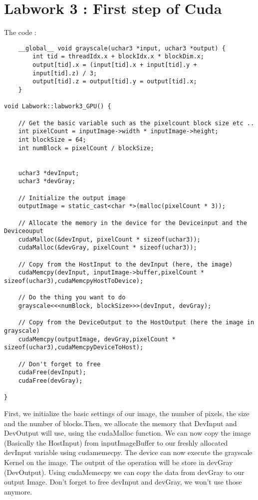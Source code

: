 \documentclass[paper=a4, fontsize=11pt]{scrartcl}
\begin{document}
\section{Labwork 3 : First step of Cuda}

    
    The code :
    \begin{verbatim}
    __global__ void grayscale(uchar3 *input, uchar3 *output) {
        int tid = threadIdx.x + blockIdx.x * blockDim.x;
        output[tid].x = (input[tid].x + input[tid].y +
        input[tid].z) / 3;
        output[tid].z = output[tid].y = output[tid].x;
    }
	
void Labwork::labwork3_GPU() {

	// Get the basic variable such as the pixelcount block size etc ..
	int pixelCount = inputImage->width * inputImage->height;
	int blockSize = 64;
	int numBlock = pixelCount / blockSize;

	
	uchar3 *devInput;
	uchar3 *devGray;
	
	// Initialize the output image
	outputImage = static_cast<char *>(malloc(pixelCount * 3));
	
	// Allocate the memory in the device for the Deviceinput and the Deviceouput
	cudaMalloc(&devInput, pixelCount * sizeof(uchar3));
	cudaMalloc(&devGray, pixelCount * sizeof(uchar3));
	
	// Copy from the HostInput to the devInput (here, the image)
	cudaMemcpy(devInput, inputImage->buffer,pixelCount * sizeof(uchar3),cudaMemcpyHostToDevice);
	
	// Do the thing you want to do
	grayscale<<<numBlock, blockSize>>>(devInput, devGray);
	
	// Copy from the DeviceOutput to the HostOutput (here the image in grayscale)
	cudaMemcpy(outputImage, devGray,pixelCount * sizeof(uchar3),cudaMemcpyDeviceToHost);
	
	// Don't forget to free
	cudaFree(devInput);
	cudaFree(devGray);

}
    \end{verbatim}
    
    First, we initialize the basic settings of our image, the number of pixels, the size and the number of blocks.Then, we allocate the memory that DevInput and DevOutput will use, using the cudaMalloc function. We can now copy the image (Basically the HostInput) from inputImageBuffer to our freshly allocated devInput variable using cudamemecpy. The device can now execute the grayscale Kernel on the image. The output of the operation will be store in devGray (DevOutput). Using cudaMemecpy we can copy the data from devGray to our output Image. Don't forget to free devInput and devGray, we won't use those anymore.\newline
    
\end{document}
